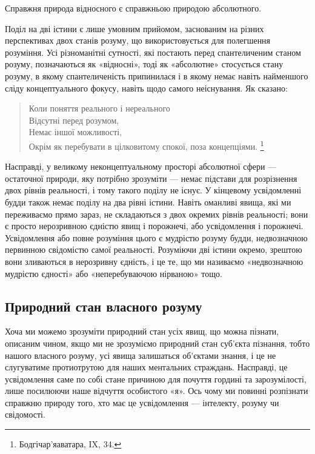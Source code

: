 \documentclass{article}
\begin{document}
Справжня природа відносного є справжньою природою абсолютного.

Поділ на дві істини є лише умовним прийомом, заснованим на різних перспективах двох станів розуму, що використовується для полегшення розуміння. Усі різноманітні сутності, які постають перед спантеличеним станом розуму, позначаються як «відносні», тоді як «абсолютне» стосується стану розуму, в якому спантеличеність припинилася і в якому немає навіть найменшого сліду концептуального фокусу, навіть щодо самого неіснування. Як сказано:

\begin{verse}
        Коли поняття реального і нереального \\
        Відсутні перед розумом, \\
        Немає іншої можливості, \\
        Окрім як перебувати в цілковитому спокої, поза концепціями. \footnote{Бодгічар’яаватара, IX, 34.} \\
\end{verse}

Насправді, у великому неконцептуальному просторі абсолютної сфери — остаточної природи, яку потрібно зрозуміти — немає підстави для розрізнення двох рівнів реальності, і тому такого поділу не існує. У кінцевому усвідомленні будди також немає поділу на два рівні істини. Навіть оманливі явища, які ми переживаємо прямо зараз, не складаються з двох окремих рівнів реальності; вони є просто нерозривною єдністю явищ і порожнечі, або усвідомлення і порожнечі.
Усвідомлення або повне розуміння цього є мудрістю розуму будди, недвозначною первинною свідомістю самої реальності. Розуміючи дві істини окремо, зрештою вони зливаються в нерозривну єдність, і це те, що ми називаємо «недвозначною мудрістю єдності» або «неперебуваючою нірваною» тощо.

\subsection{Природний стан власного розуму}

Хоча ми можемо зрозуміти природний стан усіх явищ, що можна пізнати,
описаним чином, якщо ми не зрозуміємо природний стан суб'єкта пізнання,
тобто нашого власного розуму, усі явища залишаться об'єктами знання,
і це не слугуватиме протиотрутою для наших ментальних страждань.
Насправді, це усвідомлення саме по собі стане причиною для почуття
гордині та зарозумілості, лише посилюючи наше відчуття особистого «я».
Ось чому ми повинні розпізнати справжню природу того,
хто має це усвідомлення — інтелекту, розуму чи свідомості.
\end{document}
